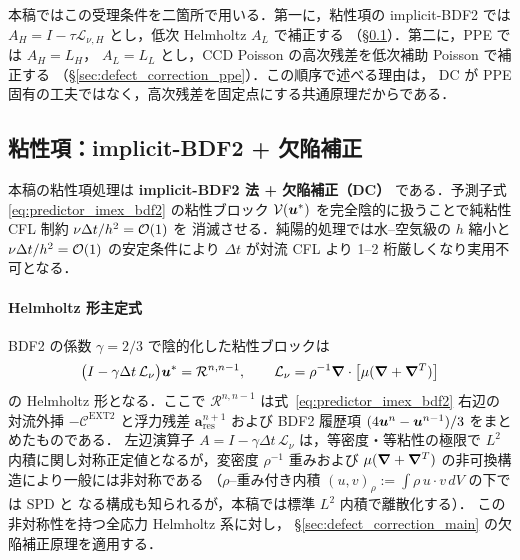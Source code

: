 本稿ではこの受理条件を二箇所で用いる．第一に，粘性項の implicit-BDF2 では
$A_H=I-\tau\mathcal{L}_{\nu,H}$ とし，低次 Helmholtz $A_L$ で補正する
（§\ref{sec:time_viscous}）．第二に，PPE では $A_H=L_H$，
$A_L=L_L$ とし，CCD Poisson の高次残差を低次補助 Poisson で補正する
（§\ref{sec:defect_correction_ppe}）．この順序で述べる理由は，
DC が PPE 固有の工夫ではなく，高次残差を固定点にする共通原理だからである．

\subsection{粘性項：implicit-BDF2 + 欠陥補正}
\label{sec:time_viscous}

本稿の粘性項処理は \textbf{implicit-BDF2 法 + 欠陥補正（DC）}
である．予測子式 \eqref{eq:predictor_imex_bdf2} の粘性ブロック
$\mathcal{V}(\bm{u}^*)$ を完全陰的に扱うことで純粘性 CFL 制約
$\nu\Delta t/h^2=\mathcal{O}(1)$ を
消滅させる．純陽的処理では水--空気級の $h$ 縮小と
$\nu\Delta t/h^2=\mathcal{O}(1)$ の安定条件により
$\Delta t$ が対流 CFL より 1--2 桁厳しくなり実用不可となる．

\paragraph{Helmholtz 形主定式}
BDF2 の係数 $\gamma=2/3$ で陰的化した粘性ブロックは
\begin{equation}
  \bigl(I - \gamma\Delta t\,\mathcal{L}_{\nu}\bigr)\bm{u}^* = \mathcal{R}^{n,n-1},
  \qquad
  \mathcal{L}_{\nu} = \rho^{-1}\bm{\nabla}\cdot\bigl[\mu(\bm{\nabla} + \bm{\nabla}^T)\bigr]
  \label{eq:helmholtz_implicit_bdf2}
\end{equation}
の Helmholtz 形となる．ここで $\mathcal{R}^{n,n-1}$ は式~\eqref{eq:predictor_imex_bdf2}
右辺の対流外挿 $-\mathcal{C}^{\mathrm{EXT2}}$ と浮力残差 $\bm{a}^{n+1}_{\mathrm{res}}$
および BDF2 履歴項 $(4\bm{u}^n - \bm{u}^{n-1})/3$ をまとめたものである．
左辺演算子 $A = I - \gamma\Delta t\,\mathcal{L}_{\nu}$ は，等密度・等粘性の極限で
$L^2$ 内積に関し対称正定値となるが，変密度 $\rho^{-1}$ 重みおよび
$\mu(\bm{\nabla}+\bm{\nabla}^T)$ の非可換構造により一般には非対称である
（$\rho$--重み付き内積 $(u,v)_\rho:=\int \rho\,u\cdot v\,dV$ の下では SPD と
なる構成も知られるが，本稿では標準 $L^2$ 内積で離散化する）．
この非対称性を持つ全応力 Helmholtz 系に対し，
§\ref{sec:defect_correction_main} の欠陥補正原理を適用する．

